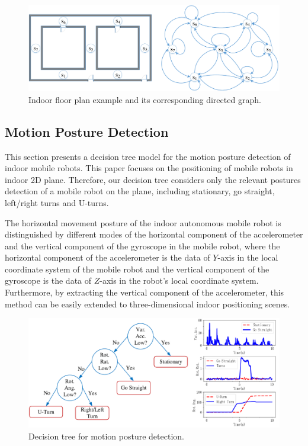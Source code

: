 \documentclass{llncs}
\begin{document}
\begin{figure}[!htbp]
	\centering
	\includegraphics[width=4.576in]{RobotMatch-MapAbstract}
	\caption{Indoor floor plan example and its corresponding directed graph.}
	\label{fig-abstract}
\end{figure}

\subsection{Motion Posture Detection}

This section presents a decision tree model for the motion posture detection of indoor mobile robots. This paper focuses on the positioning of mobile robots in indoor 2D plane. Therefore, our decision tree considers only the relevant postures detection of a mobile robot on the plane, including stationary, go straight, left/right turns and U-turns.

The horizontal movement posture of the indoor autonomous mobile robot is distinguished by different modes of the horizontal component of the accelerometer and the vertical component of the gyroscope in the mobile robot, where the horizontal component of the accelerometer is the data of $Y$-axis in the local coordinate system of the mobile robot and the vertical component of the gyroscope is the data of $Z$-axis in the robot's local coordinate system. Furthermore, by extracting the vertical component of the accelerometer, this method can be easily extended to three-dimensional indoor positioning scenes.

\begin{figure}[!htbp]
	\centering
	\includegraphics[width=4.95in]{RobotMatch-ActivityDecision}
	\caption{Decision tree for motion posture detection.}
	\label{fig-posture}
\end{figure}
\end{document}
